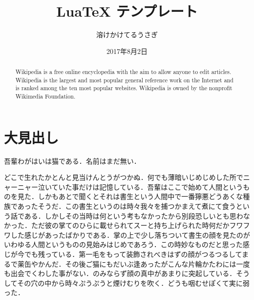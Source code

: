 \documentclass[10pt,a4paper]{ltjsarticle}			%
\begin{document}
\title{LuaTeX テンプレート}
\author{溶けかけてるうさぎ}
\date{2017年8月2日}
\maketitle

\thispagestyle{fancy}
\pagestyle{fancy}


\renewcommand{\abstractname}{Abstract}
\begin{abstract}
Wikipedia is a free online encyclopedia with the aim to allow anyone to edit articles. Wikipedia is the largest and most popular general reference work on the Internet and is ranked among the ten most popular websites. Wikipedia is owned by the nonprofit Wikimedia Foundation.
\end{abstract}


\section{大見出し}
吾輩わがはいは猫である．名前はまだ無い．

どこで生れたかとんと見当けんとうがつかぬ．何でも薄暗いじめじめした所でニャーニャー泣いていた事だけは記憶している．吾輩はここで始めて人間というものを見た．しかもあとで聞くとそれは書生という人間中で一番獰悪どうあくな種族であったそうだ．この書生というのは時々我々を捕つかまえて煮にて食うという話である．しかしその当時は何という考もなかったから別段恐しいとも思わなかった．ただ彼の掌てのひらに載せられてスーと持ち上げられた時何だかフワフワした感じがあったばかりである．掌の上で少し落ちついて書生の顔を見たのがいわゆる人間というものの見始みはじめであろう．この時妙なものだと思った感じが今でも残っている．第一毛をもって装飾されべきはずの顔がつるつるしてまるで薬缶やかんだ．その後ご猫にもだいぶ逢あったがこんな片輪かたわには一度も出会でくわした事がない．のみならず顔の真中があまりに突起している．そうしてその穴の中から時々ぷうぷうと煙けむりを吹く．どうも咽むせぽくて実に弱った．
\end{document}
